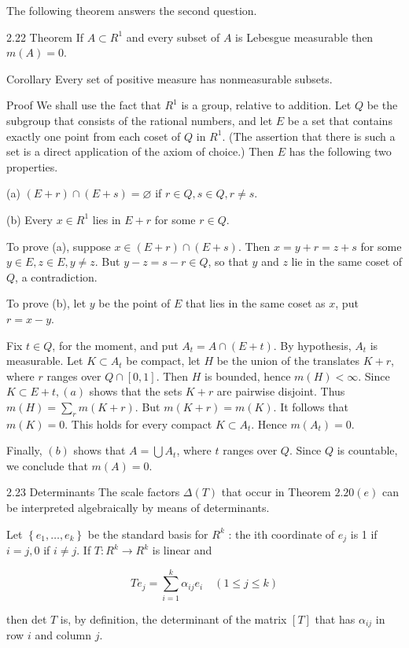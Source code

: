 \documentclass[10pt]{article}
\begin{document}
The following theorem answers the second question.

2.22 Theorem If $A \subset R^{1}$ and every subset of $A$ is Lebesgue measurable then $m(A)=0$.

Corollary Every set of positive measure has nonmeasurable subsets.

Proof We shall use the fact that $R^{1}$ is a group, relative to addition. Let $Q$ be the subgroup that consists of the rational numbers, and let $E$ be a set that contains exactly one point from each coset of $Q$ in $R^{1}$. (The assertion that
there is such a set is a direct application of the axiom of choice.) Then $E$ has the following two properties.

(a) $(E+r) \cap(E+s)=\varnothing$ if $r \in Q, s \in Q, r \neq s$.

(b) Every $x \in R^{1}$ lies in $E+r$ for some $r \in Q$.

To prove (a), suppose $x \in(E+r) \cap(E+s)$. Then $x=y+r=z+s$ for some $y \in E, z \in E, y \neq z$. But $y-z=s-r \in Q$, so that $y$ and $z$ lie in the same coset of $Q$, a contradiction.

To prove (b), let $y$ be the point of $E$ that lies in the same coset as $x$, put $r=x-y$.

Fix $t \in Q$, for the moment, and put $A_{t}=A \cap(E+t)$. By hypothesis, $A_{t}$ is measurable. Let $K \subset A_{t}$ be compact, let $H$ be the union of the translates $K+r$, where $r$ ranges over $Q \cap[0,1]$. Then $H$ is bounded, hence $m(H)<\infty$. Since $K \subset E+t,(a)$ shows that the sets $K+r$ are pairwise disjoint. Thus $m(H)=\sum_{r} m(K+r)$. But $m(K+r)=m(K)$. It follows that $m(K)=0$. This holds for every compact $K \subset A_{t}$. Hence $m\left(A_{t}\right)=0$.

Finally, $(b)$ shows that $A=\bigcup A_{t}$, where $t$ ranges over $Q$. Since $Q$ is countable, we conclude that $m(A)=0$.

2.23 Determinants The scale factors $\Delta(T)$ that occur in Theorem $2.20(e)$ can be interpreted algebraically by means of determinants.

Let $\left\{e_{1}, \ldots, e_{k}\right\}$ be the standard basis for $R^{k}$ : the ith coordinate of $e_{j}$ is 1 if $i=j, 0$ if $i \neq j$. If $T: R^{k} \rightarrow R^{k}$ is linear and

$$
T e_{j}=\sum_{i=1}^{k} \alpha_{i j} e_{i} \quad(1 \leq j \leq k)
$$

then det $T$ is, by definition, the determinant of the matrix $[T]$ that has $\alpha_{i j}$ in row $i$ and column $j$.
\end{document}
